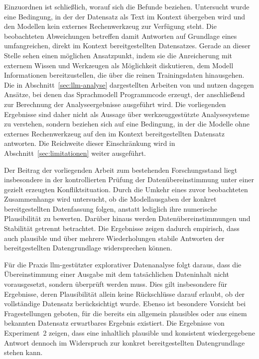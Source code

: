 Einzuordnen ist schließlich, worauf sich die Befunde beziehen. Untersucht wurde eine Bedingung, in der der Datensatz als Text im Kontext übergeben wird und den Modellen kein externes Rechenwerkzeug zur Verfügung steht. Die beobachteten Abweichungen betreffen damit Antworten auf Grundlage eines umfangreichen, direkt im Kontext bereitgestellten Datensatzes. Gerade an dieser Stelle sehen \textcite{xu_hallucination_2025} einen möglichen Ansatzpunkt, indem sie die Anreicherung mit externem Wissen und Werkzeugen als Möglichkeit diskutieren, dem Modell Informationen bereitzustellen, die über die reinen Trainingsdaten hinausgehen. Die in Abschnitt~\ref{sec:llm-analyse} dargestellten Arbeiten von \textcite{cheng_gpt_2023} und \textcite{zhecheva_exploratory_2024} nutzen dagegen Ansätze, bei denen das Sprachmodell Programmcode erzeugt, der anschließend zur Berechnung der Analyseergebnisse ausgeführt wird. Die vorliegenden Ergebnisse sind daher nicht als Aussage über werkzeuggestützte Analysesysteme zu verstehen, sondern beziehen sich auf eine Bedingung, in der die Modelle ohne externes Rechenwerkzeug auf den im Kontext bereitgestellten Datensatz antworten. Die Reichweite dieser Einschränkung wird in Abschnitt~\ref{sec:limitationen} weiter ausgeführt.

Der Beitrag der vorliegenden Arbeit zum bestehenden Forschungsstand liegt insbesondere in der kontrollierten Prüfung der Datenübereinstimmung unter einer gezielt erzeugten Konfliktsituation. Durch die Umkehr eines zuvor beobachteten Zusammenhangs wird untersucht, ob die Modellausgaben der konkret bereitgestellten Datenfassung folgen, anstatt lediglich  ihre numerische Plausibilität zu bewerten. Darüber hinaus werden Datenübereinstimmungen und Stabilität getrennt betrachtet. Die Ergebnisse zeigen dadurch empirisch, dass auch plausible und über mehrere Wiederholungen stabile Antworten der bereitgestellten Datengrundlage widersprechen können.

Für die Praxis \gls{llm}-gestützter explorativer Datenanalyse folgt daraus, dass die Übereinstimmung einer Ausgabe mit dem tatsächlichen Dateninhalt nicht vorausgesetzt, sondern überprüft werden muss. Dies gilt insbesondere für Ergebnisse, deren Plausibilität allein keine Rückschlüsse darauf erlaubt, ob der vollständige Datensatz berücksichtigt wurde. Ebenso ist besondere Vorsicht bei Fragestellungen geboten, für die bereits ein allgemein plausibles oder aus einem bekannten Datensatz erwartbares Ergebnis existiert. Die Ergebnisse von Experiment~2 zeigen, dass eine inhaltlich plausible und konsistent wiedergegebene Antwort dennoch im Widerspruch zur konkret bereitgestellten Datengrundlage stehen kann.

